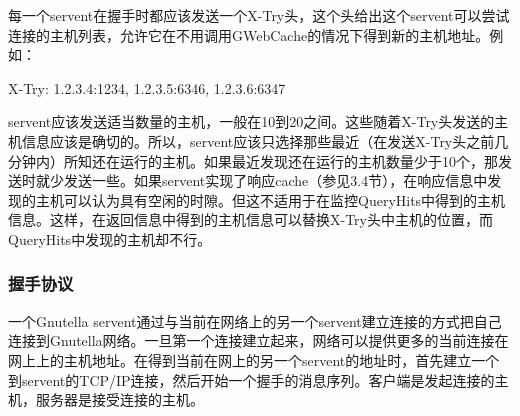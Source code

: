 \documentclass{ctexart}
\begin{document}
\begin{enumerate}
	每一个servent在握手时都应该发送一个X-Try头，这个头给出这个servent可以尝试连接的主机列表，允许它在不用调用GWebCache的情况下得到新的主机地址。例如：

	X-Try:  1.2.3.4:1234, 1.2.3.5:6346, 1.2.3.6:6347

	servent应该发送适当数量的主机，一般在10到20之间。这些随着X-Try头发送的主机信息应该是确切的。所以，servent应该只选择那些最近（在发送X-Try头之前几分钟内）所知还在运行的主机。如果最近发现还在运行的主机数量少于10个，那发送时就少发送一些。如果servent实现了响应cache（参见3.4节），在响应信息中发现的主机可以认为具有空闲的时隙。但这不适用于在监控QueryHits中得到的主机信息。这样，在返回信息中得到的主机信息可以替换X-Try头中主机的位置，而QueryHits中发现的主机却不行。
\end{enumerate}
\subsubsection{握手协议}
一个Gnutella servent通过与当前在网络上的另一个servent建立连接的方式把自己连接到Gnutella网络。一旦第一个连接建立起来，网络可以提供更多的当前连接在网上上的主机地址。在得到当前在网上的另一个servent的地址时，首先建立一个到servent的TCP/IP连接，然后开始一个握手的消息序列。客户端是发起连接的主机，服务器是接受连接的主机。
\end{document}
